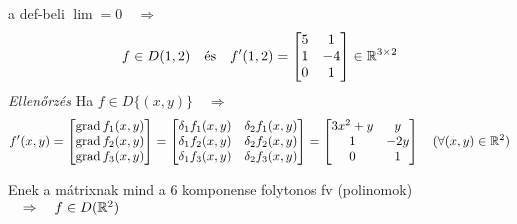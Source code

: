 \documentclass[a4paper,11.5pt]{article}
\DeclareMathOperator{\grad}{grad}
\begin{document}
\begin{task}
\begin{task}
			a def-beli $\lim=0\quad \Rightarrow
			\quad$
			\[ f\in D(1,2)\quad \text{és}\quad f'(1,2)=\begin{bmatrix}
				5&1\\
				1&-4\\
				0&1
			\end{bmatrix}\in\mathbb{R}^{3\times 2} \]
			\textit{Ellenőrzés}
			Ha $f\in D\{(x,y)\}\quad \Rightarrow$
			\[ f'(x,y)=\begin{bmatrix}
				\grad f_1(x,y)\\
				\grad f_2(x,y)\\
				\grad f_3(x,y)
			\end{bmatrix} =\begin{bmatrix}
				\delta_1 f_1(x,y)&\delta_2 f_1(x,y)\\
				\delta_1 f_2(x,y)&\delta_2 f_2(x,y)\\
				\delta_1 f_3(x,y)&\delta_2 f_3(x,y)
			\end{bmatrix}=\begin{bmatrix}
				3x^2+y&y\\
				1&-2y\\
				0&1
			\end{bmatrix}\quad (\forall (x,y)\in\R^2) \]
			
			Enek a mátrixnak mind a 6 komponense folytonos fv (polinomok)$\quad \Rightarrow\quad f\in D(\mathbb{R}^2)$
		\end{task}
	\end{task}
\end{document}
